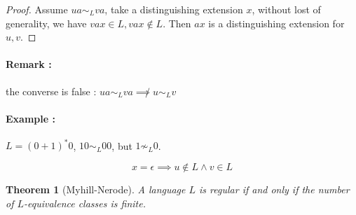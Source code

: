 \documentclass[a4paper,11pt]{article}
\newtheorem{thm}{Theorem}[section]
\begin{document}
\begin{proof}
  Assume $ua \sim_L va$, take a distinguishing extension $x$, without lost of
  generality, we have $vax \in L, vax \not \in L$. Then $ax$ is a distinguishing
  extension for $u,v$.
\end{proof}

\paragraph{Remark : } the converse is false : $ua \sim_L va \not \implies u
\sim_L v$
\paragraph{Example : } $L = (0 + 1)^* 0$, $10 \sim_L 00$, but $1 \not \sim_L 0$.

\[
  x = \epsilon \implies u \not \in L \wedge v \in L
\]

\begin{thm}[Myhill-Nerode]
  A language $L$ is regular if and only if the number of $L$-equivalence classes
  is finite.
\end{thm}
\end{document}

